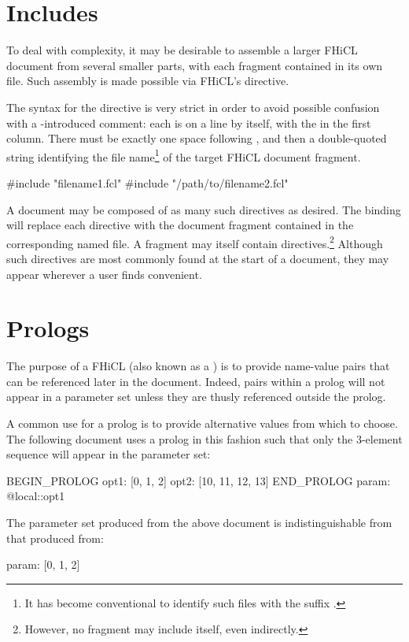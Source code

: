 \documentclass{memarticle}
\newcommand{\fhicl}%
 {FHiCL\xspace}
\begin{document}
\chapter{Includes}

To deal with complexity,
it may be desirable
to assemble a larger \fhicl document
from several smaller parts,
with each fragment contained in its own file.
Such assembly is made possible
via \fhicl's  directive.

The syntax for the directive is very strict
in order to avoid possible confusion with a \fclcode{#}-introduced comment:
each  is on a line by itself,
with the \fclcode{#} in the first column.
There must be exactly one space following ,
and then a double-quoted string identifying the file name\footnote{%
  It has become conventional
  to identify such files
  with the suffix .%
}
of the target \fhicl document fragment.
\Needspace{0.34in}
\begin{fcllisting}[texcl,escapechar=`]
#include "filename1.fcl"
#include "/path/to/filename2.fcl"
\end{fcllisting}

A document may be composed
of as many such directives as desired.
The binding will replace each directive
with the document fragment contained in the corresponding named file.
A fragment may itself contain  directives.\footnote{%
  However, no fragment may include itself,
  even indirectly.%
}
Although such directives are most commonly found
at the start of a document,
they may appear wherever a user finds convenient.


\chapter{Prologs}

The purpose of a \fhicl {}
(also known as a )
is to provide name-value pairs
that can be referenced
later in the document.
Indeed,
pairs within a prolog
will not appear
in a parameter set
unless they are thusly referenced
outside the prolog.

A common use for a prolog
is to provide alternative values
from which to choose.
The following document uses a prolog in this fashion
such that only the 3-element sequence
will appear in the parameter set:
\Needspace{0.84in}
\begin{fcllisting}[texcl,escapechar=`]
BEGIN_PROLOG
  opt1: [0, 1, 2]
  opt2: [10, 11, 12, 13]
END_PROLOG
param: @local::opt1
\end{fcllisting}
The parameter set produced from the above document
is indistinguishable from that
produced from:
\Needspace{0.17in}
\begin{fcllisting}[texcl,escapechar=`]
param: [0, 1, 2]
\end{fcllisting}
\end{document}
